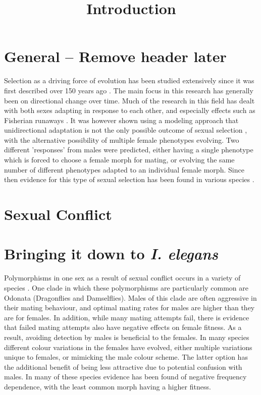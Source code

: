 \documentclass{article}
\title{Introduction}
\date{\vspace{-5ex}}
\begin{document}
\maketitle

\section{General -- Remove header later}
Selection as a driving force of evolution has been studied extensively since it was first described over 150 years ago \cite{Darwin1859, Wallace1858}. The main focus in this research has generally been on directional change over time. Much of the research in this field has dealt with both sexes adapting in response to each other, and especially effects such as Fisherian runaways \cite{Fisher1915}. It was however shown using a modeling approach that unidirectional adaptation is not the only possible outcome of sexual selection \cite{Gavrilets2002}, with the alternative possibility of multiple female phenotypes evolving. Two different 'responses' from males were predicted, either having a single phenotype which is forced to choose a female morph for mating, or evolving the same number of different phenotypes adapted to an individual female morph. Since then evidence for this type of sexual selection has been found in various species \cite{Hardling2006,Kagawa2016,Svensson2007}.

\section{Sexual Conflict}
\cite{Chapman2003}


\section{Bringing it down to \textit{I. elegans}}
Polymorphisms in one sex as a result of sexual conflict occurs in a variety of species \cite{Needed}. One clade in which these polymorphisms are particularly common are Odonata (Dragonflies and Damselflies). Males of this clade are often aggressive in their mating behaviour, and optimal mating rates for males are higher than they are for females. In addition, while many mating attempts fail, there is evidence that failed mating attempts also have negative effects on female fitness. As a result, avoiding detection by males is beneficial to the females. In many species different colour variations in the females have evolved, either multiple variations unique to females, or mimicking the male colour scheme. The latter option has the additional benefit of being less attractive due to potential confusion with males. In many of these species evidence has been found of negative frequency dependence, with the least common morph having a higher fitness.
\end{document}
